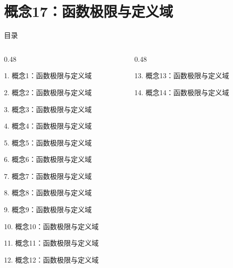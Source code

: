 \documentclass[aspectratio=169,10pt,fontset=fandol]{ctexbeamer}
\begin{document}
\section{概念17：函数极限与定义域}
\begin{frame}[t,fragile]{目录}
\small
\begin{columns}[T,onlytextwidth]
\begin{column}{0.48\textwidth}
{\color{black}\small 1. 概念1：函数极限与定义域\par}\vspace{0.22em}
{\color{black}\small 2. 概念2：函数极限与定义域\par}\vspace{0.22em}
{\color{black}\small 3. 概念3：函数极限与定义域\par}\vspace{0.22em}
{\color{black}\small 4. 概念4：函数极限与定义域\par}\vspace{0.22em}
{\color{black}\small 5. 概念5：函数极限与定义域\par}\vspace{0.22em}
{\color{black}\small 6. 概念6：函数极限与定义域\par}\vspace{0.22em}
{\color{black}\small 7. 概念7：函数极限与定义域\par}\vspace{0.22em}
{\color{black}\small 8. 概念8：函数极限与定义域\par}\vspace{0.22em}
{\color{black}\small 9. 概念9：函数极限与定义域\par}\vspace{0.22em}
{\color{black}\small 10. 概念10：函数极限与定义域\par}\vspace{0.22em}
{\color{black}\small 11. 概念11：函数极限与定义域\par}\vspace{0.22em}
{\color{black}\small 12. 概念12：函数极限与定义域\par}\vspace{0.22em}
\end{column}
\begin{column}{0.48\textwidth}
{\color{black}\small 13. 概念13：函数极限与定义域\par}\vspace{0.22em}
{\color{black}\small 14. 概念14：函数极限与定义域\par}\vspace{0.22em}

\end{column}
\end{columns}
\end{frame}
\end{document}
